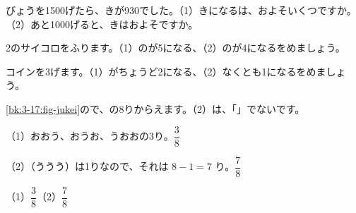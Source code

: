 \begingroup{}%
\noindent\begin{minipage}[t]{0.49\linewidth}
\begin{jibun}
びょうを1500げたら、きが930でした。（1）きになるは、およそいくつですか。（2）あと1000げると、きはおよそですか。
\end{jibun}
\end{minipage}\hfill
\begin{minipage}[t]{0.49\linewidth}
\begin{jibun}
2のサイコロをふります。（1）のが5になる、（2）のが4になるをめましょう。
\end{jibun}
\end{minipage}\par
\endgroup

\begin{reidai}[\R{樹形図}{じゅ|けい|ず}で\R{数}{かぞ}える]
コインを3げます。（1）がちょうど2になる、（2）なくとも1になるをめましょう。\par
\kangaekata {}\ref{bk:3-17:fig-jukei}ので、の8りからえます。（2）は、「」でないです。\par
\shiki（1）\nobreak おおう、おうお、うおおの3り。$\dfrac{3}{8}$\par
\hspace*{2.6\zw}（2）\nobreak {}（ううう）は1りなので、それは $8-1=7$ り。$\dfrac{7}{8}$\par
\kotae（1）\nobreak $\dfrac{3}{8}$\quad（2）\nobreak $\dfrac{7}{8}$
\end{reidai}

